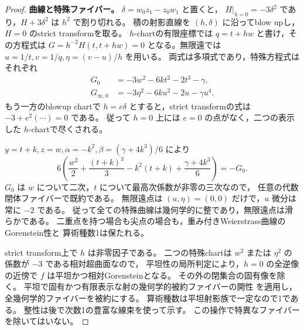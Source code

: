 \begin{proof}
\textbf{曲線と特殊ファイバー。}
$\delta=w_0z_1-z_0w_1$ と置くと，
$H|_{h=0}=-3\delta^2$ であり，$H+3\delta^2$ は $h^2$ で割り切れる。
積の射影直線を $(h,\delta)$ に沿ってblow upし，$H=0$ のstrict transformを取る。
$h$-chartの有限座標では $q=t+hw$ と書け，その方程式は
$G=h^{-2}H(t,t+hw)=0$ となる。無限遠では
$u=1/t,v=1/q,\eta=(v-u)/h$ を用いる。
両式は多項式であり，特殊方程式はそれぞれ
\begin{equation}\label{eq:degree-one-integral-special-charts}
 \begin{aligned}
 G_0&=-3w^2-6kt^2-2t^3-\gamma,\\
 G_{\infty,0}&=-3\eta^2-6ku^2-2u-\gamma u^4.
 \end{aligned}
\end{equation}
もう一方のblowup chartで $h=e\delta$ とすると，strict transformの式は
$-3+e^2(\cdots)=0$ である。
従って $h=0$ 上には $e=0$ の点がなく，二つの表示した $h$-chartで尽くされる。

$y=t+k,z=w,\alpha=-k^2,\beta=(\gamma+4k^3)/6$ により
\[
 6\left(\frac{w^2}{2}+\frac{(t+k)^3}{3}
             -k^2(t+k)+\frac{\gamma+4k^3}{6}\right)=-G_0.
\]
$G_0$ は $w$ について二次，$t$ について最高次係数が非零の三次なので，
任意の代数閉体ファイバーで既約である。
無限遠点は $(u,\eta)=(0,0)$ だけで，$u$ 微分は常に $-2$ である。
従って全ての特殊曲線は幾何学的に整であり，無限遠点は滑らかである。
二重点を持つ場合も尖点の場合も，重み付きWeierstrass曲線のGorenstein性と
算術種数1は保たれる。

strict transform上で $h$ は非零因子である。
二つの特殊chartは $w^2$ または $\eta^2$ の係数が $-3$ である相対超曲面なので，
平坦性の局所判定により，$h=0$ の全逆像の近傍で $f$ は平坦かつ相対Gorensteinとなる。
その外の閉集合の固有像を除く。
平坦で固有かつ有限表示な射の幾何学的被約ファイバーの開性
\cite[Tag 0C0E]{StacksProject}を適用し，全幾何学的ファイバーを被約にする。
算術種数は平坦射影族で一定なので1である。
整性は後で次数1の豊富な線束を使って示す。
この操作で特異なファイバーを除いてはいない。


\end{proof}
